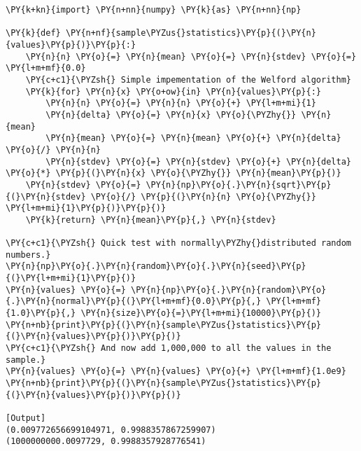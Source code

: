 \begin{Verbatim}[label=\makebox{\href{https://bitbucket.org/lbaldini/statnotes/src/master/snippets/sample\_stat3.py}{https://bitbucket.org/.../sample\_stat3.py}},commandchars=\\\{\}]
\PY{k+kn}{import} \PY{n+nn}{numpy} \PY{k}{as} \PY{n+nn}{np}

\PY{k}{def} \PY{n+nf}{sample\PYZus{}statistics}\PY{p}{(}\PY{n}{values}\PY{p}{)}\PY{p}{:}
    \PY{n}{n} \PY{o}{=} \PY{n}{mean} \PY{o}{=} \PY{n}{stdev} \PY{o}{=} \PY{l+m+mf}{0.0}
    \PY{c+c1}{\PYZsh{} Simple impementation of the Welford algorithm}
    \PY{k}{for} \PY{n}{x} \PY{o+ow}{in} \PY{n}{values}\PY{p}{:}
        \PY{n}{n} \PY{o}{=} \PY{n}{n} \PY{o}{+} \PY{l+m+mi}{1}
        \PY{n}{delta} \PY{o}{=} \PY{n}{x} \PY{o}{\PYZhy{}} \PY{n}{mean}
        \PY{n}{mean} \PY{o}{=} \PY{n}{mean} \PY{o}{+} \PY{n}{delta} \PY{o}{/} \PY{n}{n}
        \PY{n}{stdev} \PY{o}{=} \PY{n}{stdev} \PY{o}{+} \PY{n}{delta} \PY{o}{*} \PY{p}{(}\PY{n}{x} \PY{o}{\PYZhy{}} \PY{n}{mean}\PY{p}{)}
    \PY{n}{stdev} \PY{o}{=} \PY{n}{np}\PY{o}{.}\PY{n}{sqrt}\PY{p}{(}\PY{n}{stdev} \PY{o}{/} \PY{p}{(}\PY{n}{n} \PY{o}{\PYZhy{}} \PY{l+m+mi}{1}\PY{p}{)}\PY{p}{)}
    \PY{k}{return} \PY{n}{mean}\PY{p}{,} \PY{n}{stdev}

\PY{c+c1}{\PYZsh{} Quick test with normally\PYZhy{}distributed random numbers.}
\PY{n}{np}\PY{o}{.}\PY{n}{random}\PY{o}{.}\PY{n}{seed}\PY{p}{(}\PY{l+m+mi}{1}\PY{p}{)}
\PY{n}{values} \PY{o}{=} \PY{n}{np}\PY{o}{.}\PY{n}{random}\PY{o}{.}\PY{n}{normal}\PY{p}{(}\PY{l+m+mf}{0.0}\PY{p}{,} \PY{l+m+mf}{1.0}\PY{p}{,} \PY{n}{size}\PY{o}{=}\PY{l+m+mi}{10000}\PY{p}{)}
\PY{n+nb}{print}\PY{p}{(}\PY{n}{sample\PYZus{}statistics}\PY{p}{(}\PY{n}{values}\PY{p}{)}\PY{p}{)}
\PY{c+c1}{\PYZsh{} And now add 1,000,000 to all the values in the sample.}
\PY{n}{values} \PY{o}{=} \PY{n}{values} \PY{o}{+} \PY{l+m+mf}{1.0e9}
\PY{n+nb}{print}\PY{p}{(}\PY{n}{sample\PYZus{}statistics}\PY{p}{(}\PY{n}{values}\PY{p}{)}\PY{p}{)}

[Output]
(0.009772656699104971, 0.9988357867259907)
(1000000000.0097729, 0.9988357928776541)
\end{Verbatim}